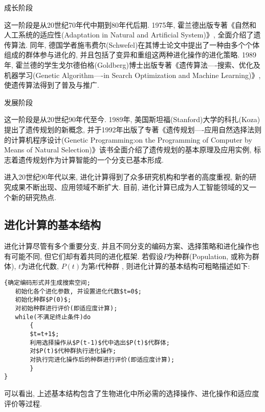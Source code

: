 {      成长阶段

     这一阶段是从20世纪70年代中期到80年代后期. 1975年, 霍兰德出版专著《自然和人工系统的适应性(Adaptation in Natural and Artificial System)》, 全面介绍了遗传算法. 同年, 德国学者施韦费尔(Schwefel)在其博士论文中提出了一种由多个个体组成的群体参与进化的, 并且包括了变异和重组这两种进化操作的进化策略. 1989年, 霍兰德的学生戈尔德伯格(Goldberg)博士出版专著《遗传算法----搜索、优化及机器学习(Genetic Algorithm----in Search Optimization and Machine Learning)》, 使遗传算法得到了普及与推广.

     发展阶段

     这一阶段是从20世纪90年代至今. 1989年, 美国斯坦福(Stanford)大学的科扎(Koza)提出了遗传规划的新概念, 并于1992年出版了专著《遗传规划----应用自然选择法则的计算机程序设计(Genetic Programming:on the Programming of Computer by Means of Natural Selection)》该书全面介绍了遗传规划的基本原理及应用实例, 标志着遗传规划作为计算智能的一个分支已基本形成.

    进入20世纪90年代以来, 进化计算得到了众多研究机构和学者的高度重视, 新的研究成果不断出现、应用领域不断扩大. 目前, 进化计算已成为人工智能领域的又一个新的研究热点.

\subsection{进化计算的基本结构}
进化计算尽管有多个重要分支, 并且不同分支的编码方案、选择策略和进化操作也有可能不同, 但它们却有着共同的进化框架. 若假设$P$为种群(Population, 或称为群体), $t$为进化代数,  $P(t)$为第$t$代种群 , 则进化计算的基本结构可粗略描述如下:
\begin{Verbatim}
{确定编码形式并生成搜索空间;
   初始化各个进化参数, 并设置进化代数$t=0$;
   初始化种群$P(0)$;
   对初始种群进行评价(即适应度计算);
   while(不满足终止条件)do
       {
       $t=t+1$;
       利用选择操作从$P(t-1)$代中选出$P(t)$代群体;
       对$P(t)$代种群执行进化操作;
       对执行完进化操作后的种群进行评价(即适应度计算);
       }
}
\end{Verbatim}

可以看出, 上述基本结构包含了生物进化中所必需的选择操作、进化操作和适应度评价等过程.

}
